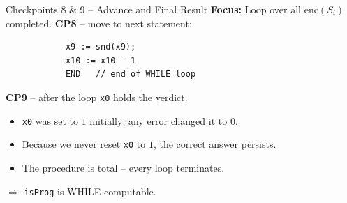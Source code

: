 \documentclass[aspectratio=169]{beamer}
\begin{document}
	\begin{frame}[fragile]{Checkpoints 8 \& 9 – Advance and Final Result}
		\textbf{Focus:} Loop over all \(\mathrm{enc}(S_i)\) completed.
		\small
		\textbf{CP8} – move to next statement:
		\begin{verbatim}
			x9 := snd(x9);
			x10 := x10 - 1
			END   // end of WHILE loop
		\end{verbatim}
		
		\textbf{CP9} – after the loop \texttt{x0} holds the verdict.
		\begin{itemize}
			\item \texttt{x0} was set to $1$ initially; any error changed it to $0$.
			\item Because we never reset \texttt{x0} to $1$, the correct answer persists.
			\item The procedure is total – every loop terminates.
		\end{itemize}
		
		\vspace{4pt}
		$\Rightarrow$ \texttt{isProg} is WHILE-computable.
	\end{frame}
	
\end{document}
